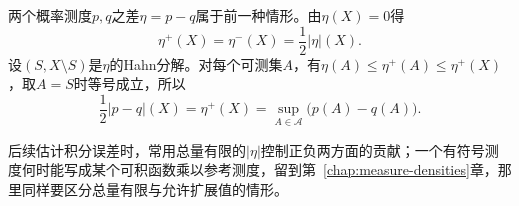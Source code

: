 两个概率测度$p,q$之差$\eta=p-q$属于前一种情形。由$\eta(X)=0$得
\[
 \eta^+(X)=\eta^-(X)=\frac12\lvert\eta\rvert(X).
\]
设$(S,X\setminus S)$是$\eta$的Hahn分解。对每个可测集$A$，有$\eta(A)\leq\eta^+(A)\leq\eta^+(X)$，取$A=S$时等号成立，所以
\begin{equation}
 \frac12\lvert p-q\rvert(X)=\eta^+(X)=\sup_{A\in\mathcal A}\bigl(p(A)-q(A)\bigr).
 \label{eq:meas-total-variation-probability}
\end{equation}

后续估计积分误差时，常用总量有限的$\lvert\eta\rvert$控制正负两方面的贡献；一个有符号测度何时能写成某个可积函数乘以参考测度，留到第~\ref{chap:measure-densities}章，那里同样要区分总量有限与允许扩展值的情形。
